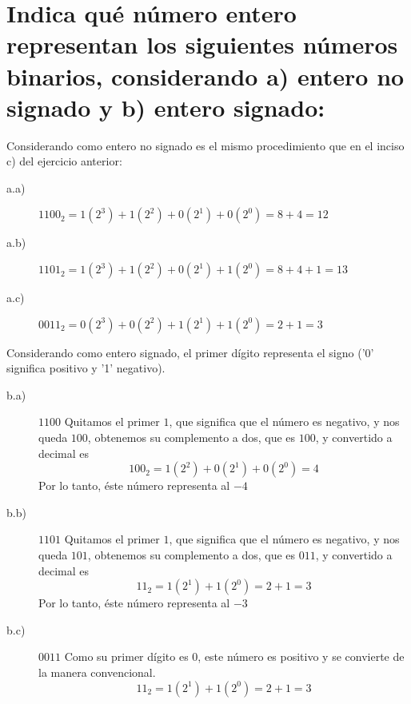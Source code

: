 \documentclass[a4paper]{article}
\begin{document}
\section{Indica qué número entero representan los siguientes números binarios, considerando a) entero no signado y b) entero signado:}

Considerando como entero no signado es el mismo procedimiento que en el inciso c) del ejercicio anterior:

\begin{description}
  \item[a.a)] 
  	$1100_2= 1(2^3)+1(2^2)+0(2^1)+0(2^0)= 8+4=12$
  \item[a.b)] 
  $1101_2= 1(2^3)+1(2^2)+0(2^1)+1(2^0)= 8+4+1=13$
  \item[a.c)] 
 $0011_2= 0(2^3)+0(2^2)+1(2^1)+1(2^0)= 2+1=3$

\end{description}

 Considerando como entero signado, el primer dígito representa el signo ('0' significa positivo y '1' negativo).

\begin{description}
\item[b.a)] $1100$
 Quitamos el primer $1$, que significa que el número es negativo, y nos queda $100$, obtenemos su complemento a dos, que es $100$, y convertido a decimal es $$100_2=1(2^2)+0(2^1)+0(2^0) =4$$
 Por lo tanto, éste número  representa al $-4$


\item[b.b)] $1101$
Quitamos el primer $1$, que significa que el número es negativo, y nos queda $101$, obtenemos su complemento a dos, que es $011$, y convertido a decimal es $$11_2= 1(2^1)+1(2^0) =2+1=3$$
 Por lo tanto, éste número  representa al $-3$


\item[b.c)] $0011$
Como su primer dígito es $0$, este número es positivo y se convierte de la manera convencional.
$$11_2= 1(2^1)+1(2^0) =2+1=3$$



\end{description}

\end{document}
